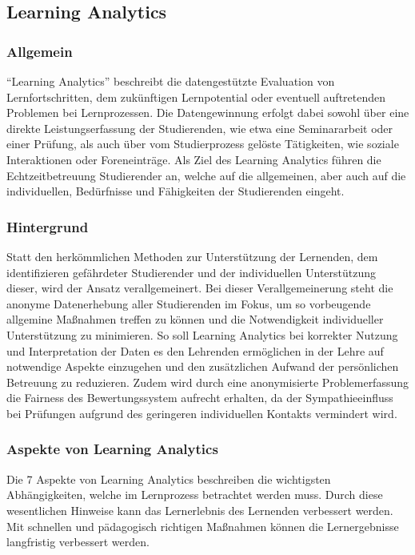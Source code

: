 \subsection{Learning Analytics}

\subsubsection{Allgemein}
\enquote{Learning Analytics} beschreibt die datengestützte Evaluation von Lernfortschritten, dem zukünftigen Lernpotential oder eventuell auftretenden Problemen bei Lernprozessen.
Die Datengewinnung erfolgt dabei sowohl über eine direkte Leistungserfassung der Studierenden, wie etwa eine Seminararbeit oder einer Prüfung, als auch über vom Studierprozess gelöste Tätigkeiten, wie soziale Interaktionen oder Foreneinträge.
Als Ziel des Learning Analytics führen \citeauthor{rf-Johnson2012TheNH} die Echtzeitbetreuung Studierender an, welche auf die allgemeinen, aber auch auf die individuellen, Bedürfnisse und Fähigkeiten der Studierenden eingeht.
\autocite{rf-Johnson2012TheNH}

\subsubsection{Hintergrund}
Statt den herkömmlichen Methoden zur Unterstützung der Lernenden, dem identifizieren gefährdeter Studierender und der individuellen Unterstützung dieser, wird der Ansatz verallgemeinert.
Bei dieser Verallgemeinerung steht die anonyme Datenerhebung aller Studierenden im Fokus, um so vorbeugende allgemine Maßnahmen treffen zu können und die Notwendigkeit individueller Unterstützung zu minimieren.
So soll Learning Analytics bei korrekter Nutzung und Interpretation der Daten es den Lehrenden ermöglichen in der Lehre auf notwendige Aspekte einzugehen und den zusätzlichen Aufwand der persönlichen Betreuung zu reduzieren.
Zudem wird durch eine anonymisierte Problemerfassung die Fairness des Bewertungssystem aufrecht erhalten, da der Sympathieeinfluss bei Prüfungen aufgrund des geringeren individuellen Kontakts vermindert wird.


\subsubsection{Aspekte von Learning Analytics}
Die 7 Aspekte von Learning Analytics\autocite{EJ-LearningAnalytics} beschreiben die wichtigsten Abhängigkeiten, welche im Lernprozess betrachtet werden muss. 
Durch diese wesentlichen Hinweise kann das Lernerlebnis des Lernenden verbessert werden. 
Mit schnellen und pädagogisch richtigen Maßnahmen können die Lernergebnisse langfristig verbessert werden. 

